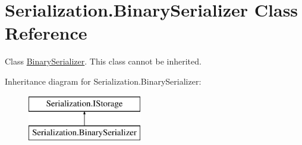 \hypertarget{class_serialization_1_1_binary_serializer}{}\section{Serialization.\+Binary\+Serializer Class Reference}
\label{class_serialization_1_1_binary_serializer}


Class \hyperlink{class_serialization_1_1_binary_serializer}{Binary\+Serializer}. This class cannot be inherited.  


Inheritance diagram for Serialization.\+Binary\+Serializer\+:\begin{figure}[H]
\begin{center}
\leavevmode
\includegraphics[height=2.000000cm]{class_serialization_1_1_binary_serializer}
\end{center}
\end{figure}
